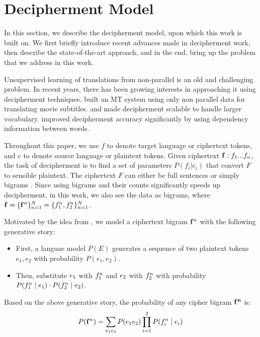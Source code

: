 \section{Decipherment Model}
In this section, we describe the decipherment model, upon which this work is built on. We first briefly introduce recent advances made in decipherment work, then describe the state-of-the-art approach, and in the end, bring up the problem that we address in this work. 

Unsupervised learning of translations from non-parallel is an old and challenging problem. In recent years, there has been growing interests in approaching it using decipherment techniques.  built an MT system using only non parallel data for translating movie subtitles.  and  made decipherment scalable to handle larger vocabulary.  improved decipherment accuracy significantly by using dependency information between words. 

Throughout this paper, we use $f$ to denote target language or ciphertext tokens, and $e$ to denote source language or plaintext tokens. Given ciphertext $\mathbf{f}:f_{1}...f_{n}$, the task of decipherment is to find a set of parameters $P(f_{i}|e_{i})$ that convert $F$ to sensible plaintext. The ciphertext $F$ can either be full sentences \cite{ravi-knight:2011,Nuhn:2012} or simply bigrams \cite{dou-knight:2013:EMNLP}. Since using bigrams and their counts significantly speeds up decipherment, in this work, we also see the data as bigrams, where $ \mathbf{f} = \{ \mathbf{f}^n \}_{n=1}^{N} = \{ f_1^n,f_2^n \}_{n=1}^{N} $. 

Motivated by the idea from , we model a ciphertext bigram $\mathbf{f}^n$ with the following generative story:

\begin{itemize}
\item  First, a languae model $P(E)$ generates a sequence of two plaintext tokens $e_{1},e_{2}$ with probability $P(e_{1},e_{2})$.
\item  Then, substitute $e_{1}$ with $f_{1}^n$ and $e_{2}$ with $f_{2}^n$ with probability $P(f_{1}^n \mid e_{1}) \cdot P(f_{2}^n \mid e_{2})$.
\end{itemize}

Based on the above generative story, the probability of any cipher bigram $\mathbf{f^n}$ is:
%
\[
\label{p_cipher}
P(\mathbf{f}^n) =  \sum_{e_{1} e_{2}} P(e_{1}e_{2}) \prod_{i=1}^{2}P(f_{i}^n \mid e_{i})
\]
%


